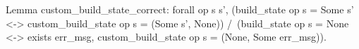 Lemma custom_build_state_correct:
   forall op s s',
     (build_state op s = Some s' <->
     custom_build_state op s = (Some s', None))
     /\
     (build_state op s = None <->
     exists err_msg, custom_build_state op s = (None, Some err_msg)).